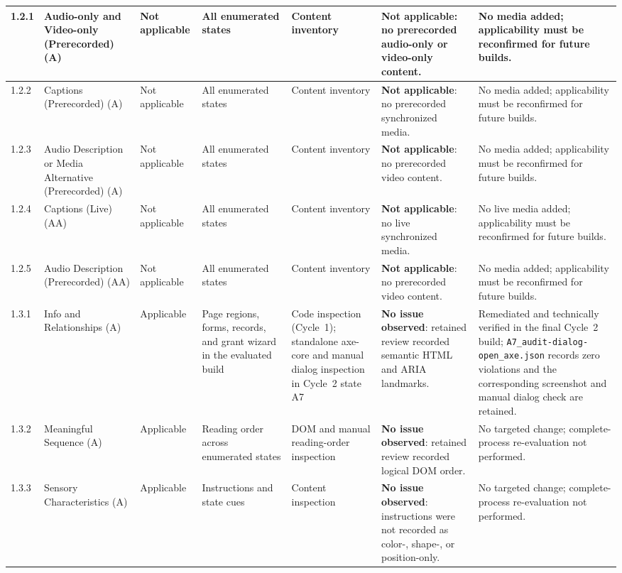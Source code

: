 \documentclass[10pt]{article}
\begin{document}
\begin{landscape}
{\begin{longtable}{|p{1.0cm}|p{3.3cm}|p{1.9cm}|p{2.7cm}|p{2.5cm}|p{4.1cm}|p{4.1cm}|}
1.2.1 & Audio-only and Video-only (Prerecorded) (A) & Not applicable & All enumerated states & Content inventory & \textbf{Not applicable}: no prerecorded audio-only or video-only content. & No media added; applicability must be reconfirmed for future builds.\\\hline
1.2.2 & Captions (Prerecorded) (A) & Not applicable & All enumerated states & Content inventory & \textbf{Not applicable}: no prerecorded synchronized media. & No media added; applicability must be reconfirmed for future builds.\\\hline
1.2.3 & Audio Description or Media Alternative (Prerecorded) (A) & Not applicable & All enumerated states & Content inventory & \textbf{Not applicable}: no prerecorded video content. & No media added; applicability must be reconfirmed for future builds.\\\hline
1.2.4 & Captions (Live) (AA) & Not applicable & All enumerated states & Content inventory & \textbf{Not applicable}: no live synchronized media. & No live media added; applicability must be reconfirmed for future builds.\\\hline
1.2.5 & Audio Description (Prerecorded) (AA) & Not applicable & All enumerated states & Content inventory & \textbf{Not applicable}: no prerecorded video content. & No media added; applicability must be reconfirmed for future builds.\\\hline
1.3.1 & Info and Relationships (A) & Applicable & Page regions, forms, records, and grant wizard in the evaluated build & Code inspection (Cycle~1); standalone axe-core and manual dialog inspection in Cycle~2 state A7 & \textbf{No issue observed}: retained review recorded semantic HTML and ARIA landmarks. & Remediated and technically verified in the final Cycle~2 build; \texttt{A7\_audit-dialog-open\_axe.json} records zero violations and the corresponding screenshot and manual dialog check are retained.\\\hline
1.3.2 & Meaningful Sequence (A) & Applicable & Reading order across enumerated states & DOM and manual reading-order inspection & \textbf{No issue observed}: retained review recorded logical DOM order. & No targeted change; complete-process re-evaluation not performed.\\\hline
1.3.3 & Sensory Characteristics (A) & Applicable & Instructions and state cues & Content inspection & \textbf{No issue observed}: instructions were not recorded as color-, shape-, or position-only. & No targeted change; complete-process re-evaluation not performed.\\\hline

\end{longtable}}
\end{landscape}
\end{document}
